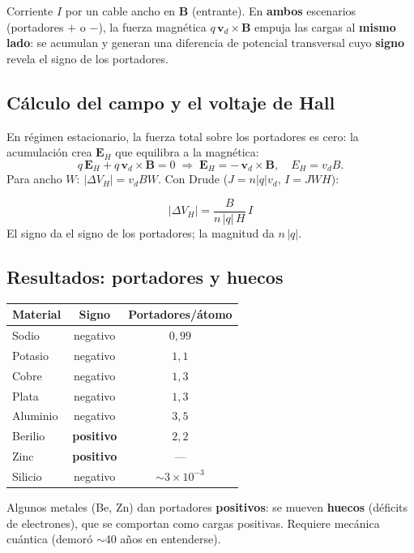 \documentclass[12pt,a4paper]{article}
\begin{document}
Corriente $I$ por un cable ancho en $\mathbf{B}$ (entrante). En
\textbf{ambos} escenarios (portadores $+$ o $-$), la fuerza magnética
$q\,\mathbf{v}_d\times\mathbf{B}$ empuja las cargas al \textbf{mismo
lado}: se acumulan y generan una diferencia de potencial transversal cuyo
\textbf{signo} revela el signo de los portadores.

\subsection{Cálculo del campo y el voltaje de Hall}

En régimen estacionario, la fuerza total sobre los portadores es cero: la
acumulación crea $\mathbf{E}_H$ que equilibra a la magnética:
\[
q\,\mathbf{E}_H + q\,\mathbf{v}_d\times\mathbf{B} = 0
\;\Longrightarrow\;
\mathbf{E}_H = -\,\mathbf{v}_d\times\mathbf{B},
\quad E_H = v_d B.
\]
Para ancho $W$: $|\Delta V_H| = v_d B W$. Con Drude
($J = n|q|v_d$, $I = J W H$):

\begin{keybox}
  \[
  \boxed{|\Delta V_H| = \frac{B}{n\,|q|\,H}\, I}
  \]
  El signo da el signo de los portadores; la magnitud da $n\,|q|$.
\end{keybox}

\subsection{Resultados: portadores y huecos}

\begin{center}
\begin{tabular}{lcc}
\toprule
\textbf{Material} & \textbf{Signo} & \textbf{Portadores/átomo} \\
\midrule
Sodio & negativo & $0{,}99$ \\
Potasio & negativo & $1{,}1$ \\
Cobre & negativo & $1{,}3$ \\
Plata & negativo & $1{,}3$ \\
Aluminio & negativo & $3{,}5$ \\
Berilio & \textbf{positivo} & $2{,}2$ \\
Zinc & \textbf{positivo} & --- \\
Silicio & negativo & $\sim 3\times10^{-3}$ \\
\bottomrule
\end{tabular}
\end{center}

\begin{warnbox}[Huecos]
  Algunos metales (Be, Zn) dan portadores \textbf{positivos}: se mueven
  \textbf{huecos} (déficits de electrones), que se comportan como cargas
  positivas. Requiere mecánica cuántica (demoró $\sim$40 años en
  entenderse).
\end{warnbox}
\end{document}
